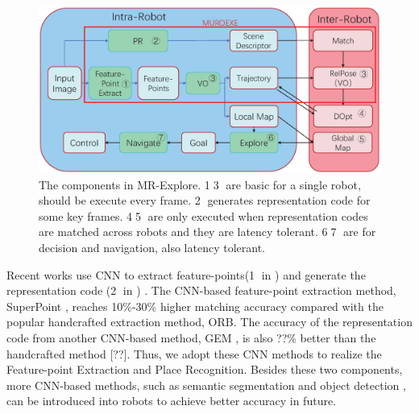 \begin{figure}[t]
	\centering
	\includegraphics[width=0.99\linewidth]{fig/maexp.eps}
    \caption{
        The components in MR-Explore. \textcircled{1}\textcircled{3} are basic for a single robot, should be execute every frame. \textcircled{2} generates representation code for some key frames. \textcircled{4}\textcircled{5} are only executed when representation codes are matched across robots and they are latency tolerant.  \textcircled{6}\textcircled{7} are for decision and navigation, also latency tolerant.
    }
	\label{fig:maexp}
\end{figure}





Recent works use CNN to extract feature-points(\textcircled{1} in ) \cite{detone2018superpoint, simo2015discriminative, yi2016lift} and generate the representation code (\textcircled{2} in ) \cite{arandjelovic2016netvlad, radenovic2018fine}. 
The CNN-based feature-point extraction method, SuperPoint \cite{detone2018superpoint}, reaches 10\%-30\% higher matching accuracy compared with the popular handcrafted extraction method, ORB\cite{Mur-Artal:2017281}.
The accuracy of the representation code from another CNN-based method, GEM \cite{radenovic2018fine}, is also ??\% better than the handcrafted method [??].
Thus, we adopt these CNN methods to realize the Feature-point Extraction and  Place Recognition. 
Besides these two components, more CNN-based methods, such as semantic segmentation \cite{long2015fully} and object detection \cite{ren2015faster}, can be introduced into robots to achieve better accuracy in future.

